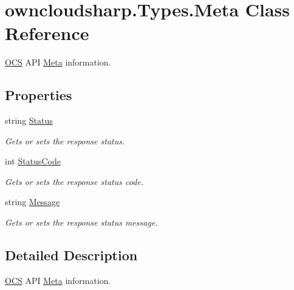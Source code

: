 \hypertarget{classowncloudsharp_1_1_types_1_1_meta}{}\section{owncloudsharp.\+Types.\+Meta Class Reference}
\label{classowncloudsharp_1_1_types_1_1_meta}


\hyperlink{classowncloudsharp_1_1_types_1_1_o_c_s}{O\+C\+S} A\+P\+I \hyperlink{classowncloudsharp_1_1_types_1_1_meta}{Meta} information.  


\subsection*{Properties}
\begin{DoxyCompactItemize}
\item 
string \hyperlink{classowncloudsharp_1_1_types_1_1_meta_acdc52e0c7e0df65d17a7247e1527f518}{Status}
\begin{DoxyCompactList}\small\item\em Gets or sets the response status. \end{DoxyCompactList}\item 
int \hyperlink{classowncloudsharp_1_1_types_1_1_meta_a8322438609748cc7c0fca4984daf39c2}{Status\+Code}
\begin{DoxyCompactList}\small\item\em Gets or sets the response status code. \end{DoxyCompactList}\item 
string \hyperlink{classowncloudsharp_1_1_types_1_1_meta_a2dcb4b0826692240c02ee824cd84b62b}{Message}
\begin{DoxyCompactList}\small\item\em Gets or sets the response status message. \end{DoxyCompactList}\end{DoxyCompactItemize}


\subsection{Detailed Description}
\hyperlink{classowncloudsharp_1_1_types_1_1_o_c_s}{O\+C\+S} A\+P\+I \hyperlink{classowncloudsharp_1_1_types_1_1_meta}{Meta} information. 



